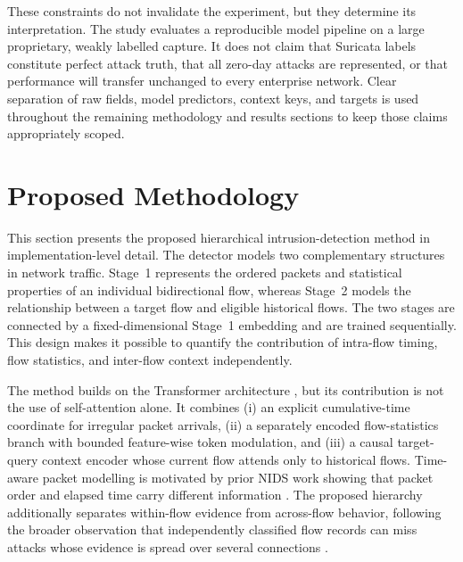 \documentclass[11pt,fleqn]{report}
\begin{document}
These constraints do not invalidate the experiment, but they determine its
interpretation. The study evaluates a reproducible model pipeline on a large
proprietary, weakly labelled capture. It does not claim that Suricata labels
constitute perfect attack truth, that all zero-day attacks are represented, or
that performance will transfer unchanged to every enterprise network. Clear
separation of raw fields, model predictors, context keys, and targets is used
throughout the remaining methodology and results sections to keep those claims
appropriately scoped.


\providecommand{\methodfield}[1]{\texttt{\detokenize{#1}}}

\chapter{Proposed Methodology}
\label{sec:proposed_methodology}

This section presents the proposed hierarchical intrusion-detection method in
implementation-level detail. The detector models two complementary structures
in network traffic. Stage~1 represents the ordered packets and statistical
properties of an individual bidirectional flow, whereas Stage~2 models the
relationship between a target flow and eligible historical flows. The two
stages are connected by a fixed-dimensional Stage~1 embedding and are trained
sequentially. This design makes it possible to quantify the contribution of
intra-flow timing, flow statistics, and inter-flow context independently.

The method builds on the Transformer architecture \cite{Vaswani2017}, but its
contribution is not the use of self-attention alone. It combines (i) an explicit
cumulative-time coordinate for irregular packet arrivals, (ii) a separately
encoded flow-statistics branch with bounded feature-wise token modulation, and
(iii) a causal target-query context encoder whose current flow attends only to
historical flows. Time-aware packet modelling is motivated by prior NIDS work
showing that packet order and elapsed time carry different information
\cite{Han2023GTID}. The proposed hierarchy additionally separates within-flow
evidence from across-flow behavior, following the broader observation that
independently classified flow records can miss attacks whose evidence is spread
over several connections
\cite{LiuPatras2022NetSentry,Manocchio2024FlowTransformer,
MartinReizabal2026FlowWindow}.
\end{document}
